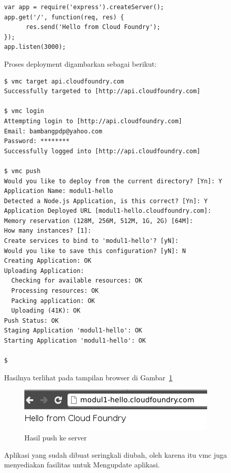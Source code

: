 \lstset{language=Javascript,caption=app.js untuk ExpressJS}
\begin{lstlisting}
var app = require('express').createServer(); 
app.get('/', function(req, res) { 
      res.send('Hello from Cloud Foundry'); 
}); 
app.listen(3000); 
\end{lstlisting}

Proses deployment digambarkan sebagai berikut:

\lstset{language=bash,caption=Deployment aplikasi ExpressJS ke CF}
\begin{lstlisting}
$ vmc target api.cloudfoundry.com 
Successfully targeted to [http://api.cloudfoundry.com] 

$ vmc login 
Attempting login to [http://api.cloudfoundry.com] 
Email: bambangpdp@yahoo.com 
Password: ******** 
Successfully logged into [http://api.cloudfoundry.com] 

$ vmc push 
Would you like to deploy from the current directory? [Yn]: Y 
Application Name: modul1-hello 
Detected a Node.js Application, is this correct? [Yn]: Y 
Application Deployed URL [modul1-hello.cloudfoundry.com]: 
Memory reservation (128M, 256M, 512M, 1G, 2G) [64M]: 
How many instances? [1]: 
Create services to bind to 'modul1-hello'? [yN]: 
Would you like to save this configuration? [yN]: N 
Creating Application: OK 
Uploading Application: 
  Checking for available resources: OK 
  Processing resources: OK 
  Packing application: OK 
  Uploading (41K): OK   
Push Status: OK 
Staging Application 'modul1-hello': OK                                          
Starting Application 'modul1-hello': OK                                         

$ 
\end{lstlisting}

Hasilnya terlihat pada tampilan browser di Gambar~\ref{fig:modul1-hello}

  \begin{figure}
    \begin{center}
      \includegraphics[scale=0.5]{images/modul1-hello.jpg}
    \end{center}
    \caption{Hasil push ke server}
    \label{fig:modul1-hello}
  \end{figure}

Aplikasi yang sudah dibuat seringkali diubah, oleh karena itu vmc juga menyediakan fasilitas untuk Mengupdate aplikasi. 

